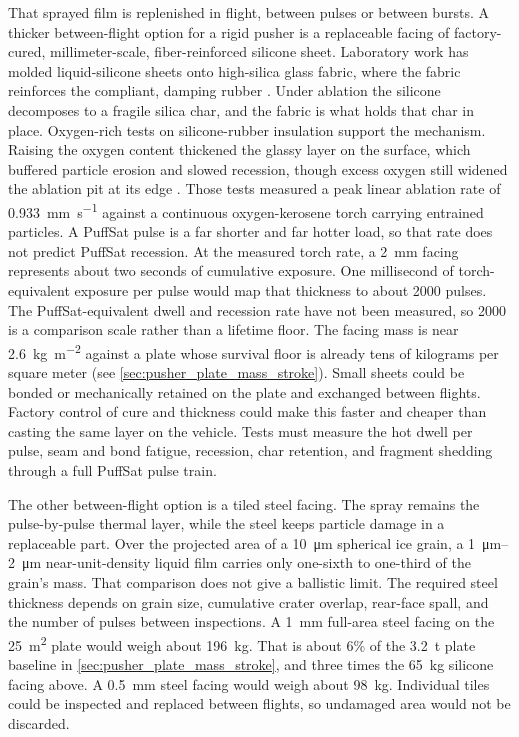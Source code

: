 \documentclass{article}
\begin{document}
That sprayed film is replenished in flight, between pulses or between bursts. A thicker between-flight option for a rigid pusher is a replaceable facing of factory-cured, millimeter-scale, fiber-reinforced silicone sheet. Laboratory work has molded liquid-silicone sheets onto high-silica glass fabric, where the fabric reinforces the compliant, damping rubber \cite{chen2018_silicone_fiber_sheet}. Under ablation the silicone decomposes to a fragile silica char, and the fabric is what holds that char in place. Oxygen-rich tests on silicone-rubber insulation support the mechanism. Raising the oxygen content thickened the glassy layer on the surface, which buffered particle erosion and slowed recession, though excess oxygen still widened the ablation pit at its edge \cite{shi2019_silicone_oxygen_ablation}. Those tests measured a peak linear ablation rate of \SI{0.933}{\milli\meter\per\second} against a continuous oxygen-kerosene torch carrying entrained particles. A PuffSat pulse is a far shorter and far hotter load, so that rate does not predict PuffSat recession. At the measured torch rate, a \SI{2}{\milli\meter} facing represents about two seconds of cumulative exposure. One millisecond of torch-equivalent exposure per pulse would map that thickness to about \num{2000} pulses. The PuffSat-equivalent dwell and recession rate have not been measured, so \num{2000} is a comparison scale rather than a lifetime floor. The facing mass is near \SI{2.6}{\kilo\gram\per\square\meter} against a plate whose survival floor is already tens of kilograms per square meter (see \autoref{sec:pusher_plate_mass_stroke}). Small sheets could be bonded or mechanically retained on the plate and exchanged between flights. Factory control of cure and thickness could make this faster and cheaper than casting the same layer on the vehicle. Tests must measure the hot dwell per pulse, seam and bond fatigue, recession, char retention, and fragment shedding through a full PuffSat pulse train.

The other between-flight option is a tiled steel facing. The spray remains the pulse-by-pulse thermal layer, while the steel keeps particle damage in a replaceable part. Over the projected area of a \SI{10}{\micro\meter} spherical ice grain, a \SIrange{1}{2}{\micro\meter} near-unit-density liquid film carries only one-sixth to one-third of the grain's mass. That comparison does not give a ballistic limit. The required steel thickness depends on grain size, cumulative crater overlap, rear-face spall, and the number of pulses between inspections. A \SI{1}{\milli\meter} full-area steel facing on the \SI{25}{\square\meter} plate would weigh about \SI{196}{\kilo\gram}. That is about 6\% of the \SI{3.2}{\tonne} plate baseline in \autoref{sec:pusher_plate_mass_stroke}, and three times the \SI{65}{\kilo\gram} silicone facing above. A \SI{0.5}{\milli\meter} steel facing would weigh about \SI{98}{\kilo\gram}. Individual tiles could be inspected and replaced between flights, so undamaged area would not be discarded.
\end{document}
